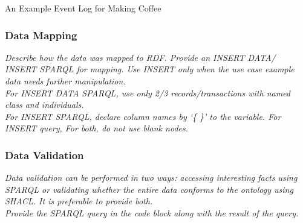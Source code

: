 \begin{table}[ht]
    \centering
    \caption{An Example Event Log for Making Coffee}
    \label{tab:my_label}
\end{table}    


\subsubsection*{Data Mapping}
 \textit{ 
Describe how the data was mapped to RDF. Provide an INSERT DATA/ INSERT SPARQL for mapping. Use INSERT only when the use case example data needs further manipulation. \\
For INSERT DATA SPARQL, use only 2/3 records/transactions with named class and individuals. \\
For INSERT SPARQL, declare column names by `\{ \}' to the variable.  
For INSERT query, 
For both, do not use blank nodes.    
  }

\subsubsection*{Data Validation}
 \textit{ 
Data validation can be performed in two ways: accessing interesting facts using SPARQL or validating whether the entire data conforms to the ontology using SHACL. It is preferable to provide both. \\
Provide the SPARQL query in the code block along with the result of the query. \\
  }